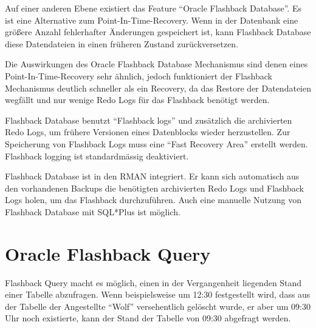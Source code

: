       Auf einer anderen Ebene existiert das Feature \enquote{Oracle Flashback Database}. Es ist eine Alternative zum Point-In-Time-Recovery. Wenn in der Datenbank eine gr\"o\ss ere Anzahl fehlerhafter \"Anderungen gespeichert ist, kann Flashback Database diese Datendateien in einen fr\"uheren Zustand zur\"uckversetzen.

			Die Auswirkungen des Oracle Flashback Database Mechanismus sind denen eines Point-In-Time-Recovery sehr \"ahnlich, jedoch funktioniert der Flashback Mechanismus deutlich schneller als ein Recovery, da das Restore der Datendateien wegf\"allt und nur wenige Redo Logs f\"ur das Flashback ben\"otigt werden.

      Flashback Database benutzt \enquote{Flashback logs} und zus\"atzlich die archivierten Redo Logs, um fr\"uhere Versionen eines Datenblocks wieder herzustellen. Zur Speicherung von Flashback Logs muss eine \enquote{Fast Recovery Area} erstellt werden. Flashback logging ist standardm\"assig deaktiviert.

      Flashback Database ist in den RMAN integriert. Er kann sich automatisch aus den vorhandenen Backups die ben\"otigten archivierten Redo Logs und Flashback Logs holen, um das Flashback durchzuf\"uhren. Auch eine manuelle Nutzung von Flashback Database mit SQL*Plus ist m\"oglich.
    \section{Oracle Flashback Query}
      Flashback Query macht es m\"oglich, einen in der Vergangenheit liegenden Stand einer Tabelle abzufragen. Wenn beispielsweise um 12:30 festgestellt wird, dass aus der Tabelle  der Angestellte \enquote{Wolf} versehentlich gel\"oscht wurde, er aber um 09:30 Uhr noch existierte, kann der Stand der Tabelle  von 09:30 abgefragt werden.

